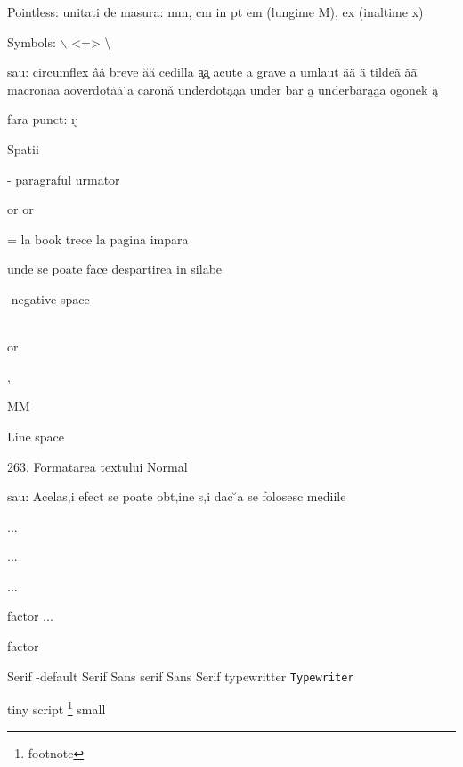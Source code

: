 Pointless:
unitati de masura: mm, cm in pt em (lungime M), ex (inaltime x)


Symbols:
$\backslash$ <=> \textbackslash

\usepackage[utf8]{inputenc}
sau:
circumflex \^{a}\^a
breve \u{a}\u a
cedilla \c{a}\c a
acute  \‘a
grave  \’a 
umlaut \"{a}\"a ä
tilde\~{a} \~aã 
macron\={a}\=a
aoverdot\.{a}\.a ̇a
caron\v{a}
underdot\d{a}\d aa
under bar \b{a}
underbar\b{a}\b aa
ogonek \k{a}

fara punct: \i \j

Spatii
\par - paragraful urmator

\newpage or \pagebreak or \clearpage

\cleardoublepage = la book trece la pagina impara

\- unde se poate face despartirea in silabe

\thinspace \medspace \thickspace
\! -negative space


\\[2cm] or \vspace{10pt}
\smallskip \medskip \bigskip

\hspace{10pt}
\hfill, \vfill \dotfill

M\hspace{-9pt}M

Line space
\linespread{1.3} %
\linespread{1.6} %

263. Formatarea textului
\singlespacing Normal
\doublespacing

sau:
Acelas,i efect se poate obt,ine s,i dac  ̆a se folosesc mediile\begin{singlespace}  ...\end{singlespace}\begin{doublespace}  ...\end{doublespace}\begin{onehalfspace}  ...\end{onehalfspace}\begin{spacing}{factor}  ...\end{spacing}{factor}

Serif -default \textrm{Serif}
Sans serif \textsf{Sans Serif}
typewritter \texttt{Typewriter}

\tiny{tiny} \scriptsize{script} \footnote{footnote} \small{small}

